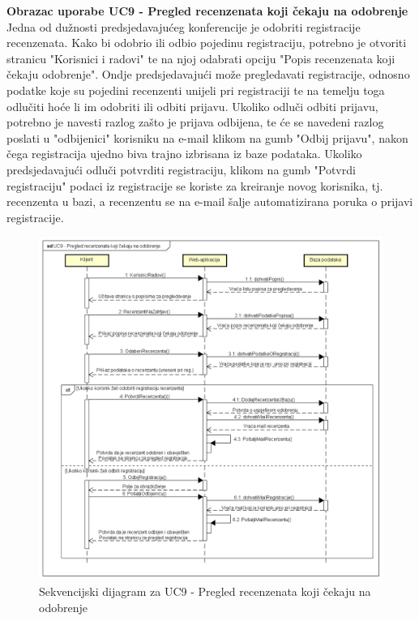 				\textbf{Obrazac uporabe UC9 - Pregled recenzenata koji čekaju na odobrenje}\\
				Jedna od dužnosti predsjedavajućeg konferencije je odobriti registracije recenzenata. Kako bi odobrio ili odbio pojedinu registraciju, potrebno je otvoriti stranicu "Korisnici i radovi" te na njoj odabrati opciju "Popis recenzenata koji čekaju odobrenje". Ondje predsjedavajući može pregledavati registracije, odnosno podatke koje su pojedini recenzenti unijeli pri registraciji te na temelju toga odlučiti hoće li im odobriti ili odbiti prijavu. Ukoliko odluči odbiti prijavu, potrebno je navesti razlog zašto je prijava odbijena, te će se navedeni razlog poslati u "odbijenici" korisniku na e-mail klikom na gumb "Odbij prijavu", nakon čega registracija ujedno biva trajno izbrisana iz baze podataka. Ukoliko predsjedavajući odluči potvrditi registraciju, klikom na gumb "Potvrdi registraciju" podaci iz registracije se koriste za kreiranje novog korisnika, tj. recenzenta u bazi, a recenzentu se na e-mail šalje automatizirana poruka o prijavi registracije.
				\eject

				\begin{figure}[H]
					\includegraphics[scale=0.50]{dijagrami/UC9-RegistrRecenzent.png} 
					\centering
					\caption{Sekvencijski dijagram za UC9 - Pregled recenzenata koji čekaju na odobrenje}
					\label{fig:sekvencijski1}
				\end{figure}


